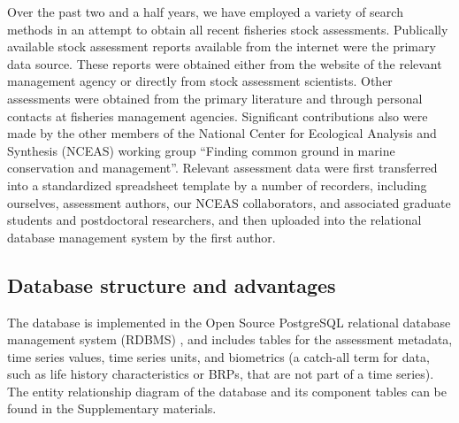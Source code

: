 \documentclass[letterpaper,review,authoryear,12pt]{elsarticle}
\begin{document}
Over the past two and a half years, we have employed a variety of search methods in an attempt to obtain all
recent fisheries stock assessments.  Publically available stock
assessment reports available from the internet were the primary data
source.  These reports were obtained either from the website of the
relevant management agency or directly from stock assessment
scientists.  Other assessments were obtained from the primary
literature and through personal contacts at fisheries management
agencies.  Significant contributions also were made by the other members
of the National Center for Ecological Analysis and Synthesis (NCEAS)
working group ``Finding common ground in marine conservation and
management''. Relevant assessment data were first transferred into a
standardized spreadsheet template by a number of recorders, including
ourselves, assessment authors, our NCEAS collaborators, and associated
graduate students and postdoctoral researchers, and then uploaded into
the relational database management system by the first author.

\subsection*{Database structure and advantages}
The database is implemented in the Open Source PostgreSQL relational
database management system (RDBMS) \citep{postgresql:2009}, and includes tables for the assessment metadata,
time series values, time series units, and biometrics (a catch-all term
for data, such as life history characteristics or BRPs, that are not
part of a time series). The entity relationship diagram of the database and its component tables can be found in the Supplementary materials.
\end{document}
